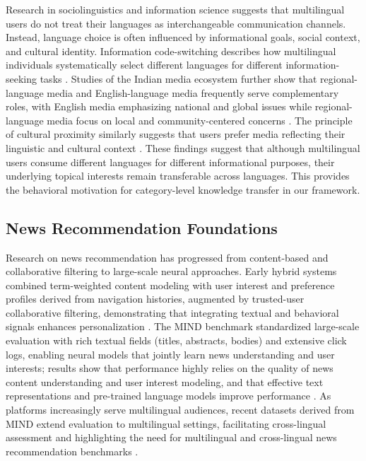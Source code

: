 \documentclass[conference]{IEEEtran}
\begin{document}
Research in sociolinguistics and information science suggests that multilingual users do not treat their languages as interchangeable communication channels. Instead, language choice is often influenced by informational goals, social context, and cultural identity. Information code-switching describes how multilingual individuals systematically select different languages for different information-seeking tasks \cite{CRL16765}. Studies of the Indian media ecosystem further show that regional-language media and English-language media frequently serve complementary roles, with English media emphasizing national and global issues while regional-language media focus on local and community-centered concerns \cite{neyazi2011politics}. The principle of cultural proximity similarly suggests that users prefer media reflecting their linguistic and cultural context \cite{ng2023web}. These findings suggest that although multilingual users consume different languages for different informational purposes, their underlying topical interests remain transferable across languages. This provides the behavioral motivation for category-level knowledge transfer in our framework.

\subsection{News Recommendation Foundations} Research on news recommendation has progressed from content-based and collaborative filtering to large-scale neural approaches. Early hybrid systems combined term-weighted content modeling with user interest and preference profiles derived from navigation histories, augmented by trusted-user collaborative filtering, demonstrating that integrating textual and behavioral signals enhances personalization \cite{WEN20125806}. The MIND benchmark standardized large-scale evaluation with rich textual fields (titles, abstracts, bodies) and extensive click logs, enabling neural models that jointly learn news understanding and user interests; results show that performance highly relies on the quality of news content understanding and user interest modeling, and that effective text representations and pre-trained language models improve performance \cite{wu-etal-2020-mind}. As platforms increasingly serve multilingual audiences, recent datasets derived from MIND extend evaluation to multilingual settings, facilitating cross-lingual assessment and highlighting the need for multilingual and cross-lingual news recommendation benchmarks \cite{multilingualdataset,10.1145/3777415}.
\end{document}
